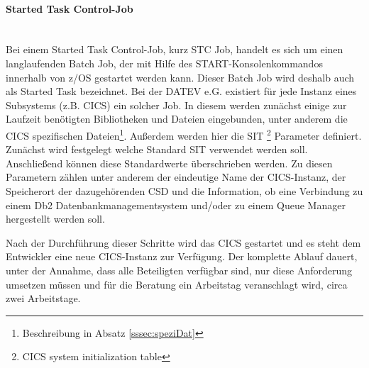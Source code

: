 \paragraph{Started Task Control-Job} ~\\
Bei einem Started Task Control-Job, kurz STC Job, handelt es sich um einen langlaufenden Batch Job, der mit Hilfe des \glqq START\grqq-Konsolenkommandos innerhalb von z/OS gestartet werden kann.
Dieser Batch Job wird deshalb auch als Started Task bezeichnet.\cite{Cassier.2007}
Bei der DATEV e.G. existiert für jede Instanz eines Subsystems (z.B. CICS) ein solcher Job.
In diesem werden zunächst einige zur Laufzeit benötigten Bibliotheken und Dateien eingebunden, unter anderem die CICS spezifischen Dateien\footnote{Beschreibung in Absatz \ref{sssec:speziDat}}.
Außerdem werden hier die SIT \footnote{CICS system initialization table} Parameter definiert.
Zunächst wird festgelegt welche Standard SIT verwendet werden soll.
Anschließend können diese Standardwerte überschrieben werden.
Zu diesen Parametern zählen unter anderem der eindeutige Name der CICS-Instanz, der Speicherort der dazugehörenden CSD und die Information, ob eine Verbindung zu einem Db2 Datenbankmanagementsystem und/oder zu einem Queue Manager hergestellt werden soll.

Nach der Durchführung dieser Schritte wird das CICS gestartet und es steht dem Entwickler eine neue CICS-Instanz zur Verfügung.
Der komplette Ablauf dauert, unter der Annahme, dass alle Beteiligten verfügbar sind, nur diese Anforderung umsetzen müssen und für die Beratung ein Arbeitstag veranschlagt wird, circa zwei Arbeitstage.

